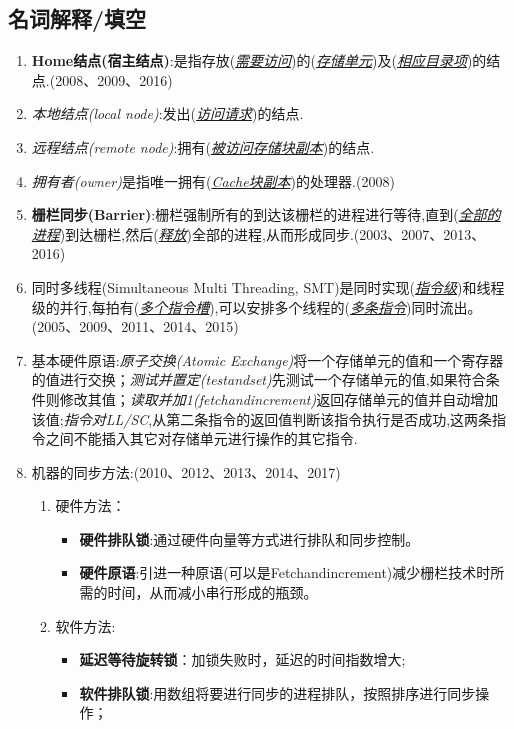 \documentclass[a4paper]{ctexart}
\newcommand{\li}{\uline{\hspace{0.5em}}}
\newcommand{\blank}[1]{(\emph{\underline{#1}})}
\begin{document}
\subsection{名词解释/填空}
\begin{enumerate}
  \item \textbf{Home结点(宿主结点)}:是指存放\blank{需要访问}的\blank{存储单元}及\blank{相应目录项}的结点.(2008、2009、2016)
  \item \emph{本地结点(local node)}:发出\blank{访问请求}的结点.
  \item \emph{远程结点(remote node)}:拥有\blank{被访问存储块副本}的结点.
  \item \emph{拥有者(owner)}是指唯一拥有\blank{Cache块副本}的处理器.(2008)
  \item \textbf{栅栏同步(Barrier)}:栅栏强制所有的到达该栅栏的进程进行等待,直到(\emph{\underline{全部的进程}})到达栅栏,然后(\emph{\underline{释放}})全部的进程,从而形成同步.(2003、2007、2013、2016)
  \item 同时多线程(Simultaneous Multi Threading, SMT)是同时实现(\emph{\underline{指令级}})和线程级的并行,每拍有(\emph{\underline{多个指令槽}}),可以安排多个线程的(\emph{\underline{多条指令}})同时流出。(2005、2009、2011、2014、2015)
  \item 基本硬件原语:\emph{原子交换(Atomic Exchange)}将一个存储单元的值和一个寄存器的值进行交换；\emph{测试并置定(test\li and\li set)}先测试一个存储单元的值,如果符合条件则修改其值；\emph{读取并加1(fetch\li and\li increment)}返回存储单元的值并自动增加该值;\emph{指令对LL/SC},从第二条指令的返回值判断该指令执行是否成功,这两条指令之间不能插入其它对存储单元进行操作的其它指令.
  \item 机器的同步方法:(2010、2012、2013、2014、2017)
  \begin{enumerate}
    \item 硬件方法：
    \begin{itemize}
      \item \textbf{硬件排队锁}:通过硬件向量等方式进行排队和同步控制。
      \item \textbf{硬件原语}:引进一种原语(可以是Fetch\li and\li increment)减少栅栏技术时所需的时间，从而减小串行形成的瓶颈。
    \end{itemize}
    \item 软件方法:
    \begin{itemize}
      \item \textbf{延迟等待旋转锁}：加锁失败时，延迟的时间指数增大;
      \item \textbf{软件排队锁}:用数组将要进行同步的进程排队，按照排序进行同步操作；

\end{itemize}
\end{enumerate}
\end{enumerate}
\end{document}
